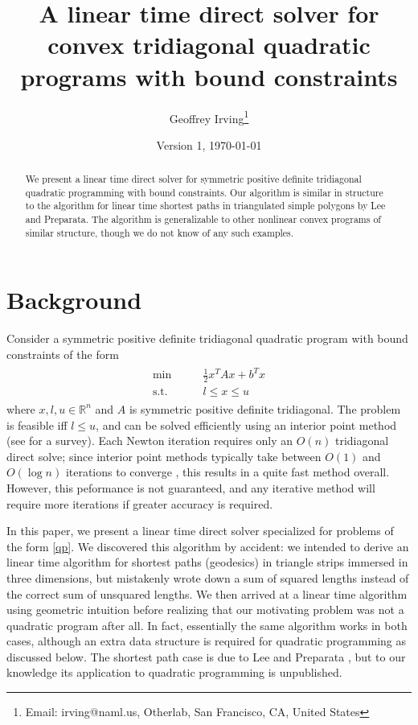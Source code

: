 \documentclass[11pt]{article}
\title{A linear time direct solver for convex tridiagonal quadratic programs with bound constraints}
\author{Geoffrey Irving\thanks{Email: irving@naml.us, Otherlab, San Francisco, CA, United States}}
\date{Version 1, \today}
\newcommand{\R}{\mathbb{R}}
\begin{document}
\maketitle

\begin{abstract}
We present a linear time direct solver for symmetric positive definite tridiagonal quadratic programming with bound constraints.  Our algorithm is similar in structure to the
algorithm for linear time shortest paths in triangulated simple polygons by Lee and Preparata.  The algorithm is generalizable to other nonlinear convex programs of similar
structure, though we do not know of any such examples.
\end{abstract}

\section{Background}

Consider a symmetric positive definite tridiagonal quadratic program with bound constraints of the form
\begin{align} \label{qp}
\begin{array}{cc}
\min          \qquad& \frac{1}{2} x^T A x + b^T x \\
\textrm{s.t.} & l \le x \le u
\end{array}
\end{align}
where $x,l,u \in \R^n$ and $A$ is symmetric positive definite tridiagonal.  The problem is feasible iff $l \le u$, and can be solved efficiently using an interior point method (see \cite{gondzio2012interior}
for a survey).  Each Newton iteration requires only an $O(n)$ tridiagonal direct solve; since interior point methods typically take between $O(1)$ and $O(\log n)$ iterations to converge \cite{colombo2008further},
this results in a quite fast method overall.  However, this peformance is not guaranteed, and any iterative method will require more iterations if greater accuracy is required.

In this paper, we present a linear time direct solver specialized for problems of the form \cref{qp}.  We discovered this algorithm by accident: we intended to derive an linear time algorithm
for shortest paths (geodesics) in triangle strips immersed in three dimensions, but mistakenly wrote down a sum of squared lengths instead of the correct sum of unsquared lengths.  We then arrived at a linear time algorithm
using geometric intuition before realizing that our motivating problem was not a quadratic program after all.  In fact, essentially the same algorithm works in both cases, although an extra data structure is required
for quadratic programming as discussed below.  The shortest path case is due to Lee and Preparata \cite{lee1984euclidean}, but to our knowledge its application to quadratic programming is unpublished.
\end{document}
